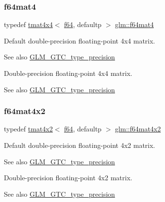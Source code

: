 \subsubsection{\texorpdfstring{f64mat4}{f64mat4}}
{\footnotesize\ttfamily typedef \hyperlink{structglm_1_1tmat4x4}{tmat4x4}$<$ \hyperlink{group__gtc__type__precision_ga2bba392e555124b36cde6abba349bab3}{f64}, defaultp $>$ \hyperlink{group__gtc__type__precision_ga5bfcfa195cfe908fe50ecc15abbf7979}{glm\+::f64mat4}}

Default double-\/precision floating-\/point 4x4 matrix. \begin{DoxySeeAlso}{See also}
\hyperlink{group__gtc__type__precision}{G\+L\+M\+\_\+\+G\+T\+C\+\_\+type\+\_\+precision}
\end{DoxySeeAlso}
Double-\/precision floating-\/point 4x4 matrix. \begin{DoxySeeAlso}{See also}
\hyperlink{group__gtc__type__precision}{G\+L\+M\+\_\+\+G\+T\+C\+\_\+type\+\_\+precision} 
\end{DoxySeeAlso}
\mbox{\label{group__gtc__type__precision_ga13dbaf75e4f1b18c35d2837067a14ce9}} 
\subsubsection{\texorpdfstring{f64mat4x2}{f64mat4x2}}
{\footnotesize\ttfamily typedef \hyperlink{structglm_1_1tmat4x2}{tmat4x2}$<$ \hyperlink{group__gtc__type__precision_ga2bba392e555124b36cde6abba349bab3}{f64}, defaultp $>$ \hyperlink{group__gtc__type__precision_ga13dbaf75e4f1b18c35d2837067a14ce9}{glm\+::f64mat4x2}}

Default double-\/precision floating-\/point 4x2 matrix. \begin{DoxySeeAlso}{See also}
\hyperlink{group__gtc__type__precision}{G\+L\+M\+\_\+\+G\+T\+C\+\_\+type\+\_\+precision}
\end{DoxySeeAlso}
Double-\/precision floating-\/point 4x2 matrix. \begin{DoxySeeAlso}{See also}
\hyperlink{group__gtc__type__precision}{G\+L\+M\+\_\+\+G\+T\+C\+\_\+type\+\_\+precision} 
\end{DoxySeeAlso}
\mbox{\label{group__gtc__type__precision_gab10a195a85f65da47bf70438f57a8a3c}} 
